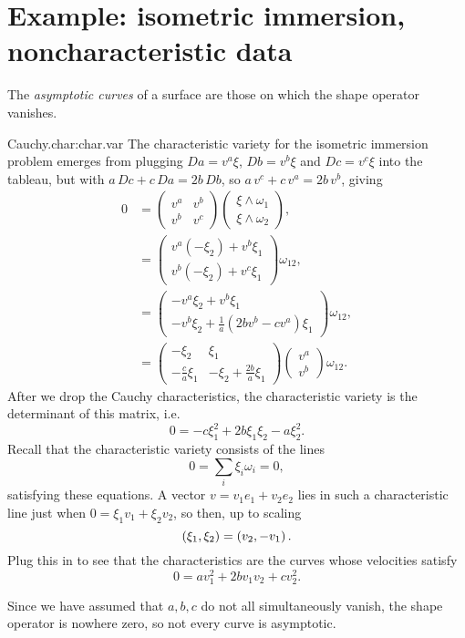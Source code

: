 \section{Example: isometric immersion, noncharacteristic data}
The \emph{asymptotic curves} of a surface are those on which the shape operator vanishes.
\begin{answer}{Cauchy.char:char.var}
The characteristic variety for the isometric immersion problem emerges from plugging \(Da=v^a\xi\), \(Db=v^b\xi\) and \(Dc=v^c\xi\) into the tableau, but with \(a \, Dc + c \, Da = 2b \, Db\), so \(a \, v^c + c \, v^a = 2b \, v^b\), giving
\begin{align*}
0
&=
\begin{pmatrix}
v^a & v^b \\
v^b & v^c
\end{pmatrix}
\begin{pmatrix}
\xi\wedge\omega_1 \\
\xi\wedge\omega_2
\end{pmatrix},
\\
&=
\begin{pmatrix}
v^a(-\xi_2) + v^b\xi_1 \\
v^b(-\xi_2)+v^c\xi_1 
\end{pmatrix}
\omega_{12},
\\
&=
\begin{pmatrix}
-v^a\xi_2 + v^b\xi_1 \\
-v^b\xi_2 + \frac{1}{a}(2bv^b-cv^a)\xi_1
\end{pmatrix}
\omega_{12},
\\
&=
\begin{pmatrix}
-\xi_2 & \xi_1 \\
-\frac{c}{a}\xi_1 & -\xi_2+\frac{2b}{a}\xi_1
\end{pmatrix}
\begin{pmatrix}
v^a\\
v^b
\end{pmatrix}
\omega_{12}.
\end{align*}
After we drop the Cauchy characteristics, the characteristic variety is the determinant of this matrix, i.e.
\[
0 = -c\xi_1^2 + 2b\xi_1 \xi_2 -a\xi_2^2.
\]
Recall that the characteristic variety consists of the lines
\[
0 = \sum_i \xi_i \omega_i=0,
\] 
satisfying these equations.
A vector \(v=v_1 e_1+v_2 e_2\) lies in such a characteristic line just when \(0 = \xi_1 v_1 + \xi_2 v_2\), so then, up to scaling 
\[
\left(\xi_1,\xi_2\right)=\left(v_2,-v_1\right).
\]
Plug this in to see that the characteristics are the curves whose velocities satisfy
\[
0 = av_1^2 + 2bv_1 v_2 + cv_2^2.
\]
\end{answer}
Since we have assumed that \(a,b,c\) do not all simultaneously vanish, the shape operator is nowhere zero, so not every curve is asymptotic.

